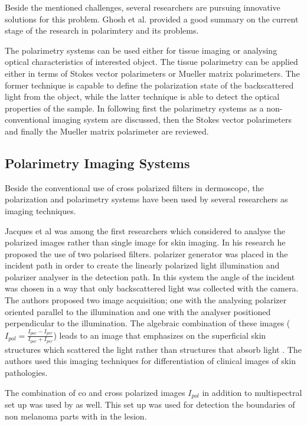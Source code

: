 \documentclass[oneside,a4,12p]{report} %
\begin{document}
	Beside the mentioned challenges, several researchers are pursuing innovative solutions for this problem. Ghosh et al. \cite{ghosh2011tissue} provided a good summary on the current stage of the research in polarimtery and its problems.
	
	The polarimetry systems can be used either for tissue imaging or analysing optical characteristics of interested object. The tissue polarimetry can be applied either in terms of Stokes vector polarimeters or Mueller matrix polarimeters. The former technique is capable to define the polarization state of the backscattered light from the object, while the latter technique is able to detect the optical properties of the sample. 
	In following first the polarimetry systems as a non-conventional imaging system are discussed, then the Stokes vector polarimeters and finally the Mueller matrix polarimeter are reviewed. 
	
	\subsection{Polarimetry Imaging Systems}
	Beside the conventional use of cross polarized filters in dermoscope, the polarization and polarimetry systems have been used by several researchers as imaging techniques.
	
	
	Jacques et al \cite{Jacques12175282} was among the first researchers which considered to analyse the polarized images rather than single image for skin imaging. In his research he proposed the use of two polarised filters. polarizer generator was placed in the incident path in order to create the linearly polarized light illumination and polarizer analyser in the detection path. In this system the angle of the incident was chosen in a way that only backscattered light was collected with the camera. The authors proposed two image acquisition; one with the analysing polarizer oriented parallel to the illumination and one with the analyser positioned perpendicular to the illumination. The algebraic combination of these images ($I_{pol} = \frac{I_{par}-I_{per}}{I_{par}+I_{per}}$) leads to an image that emphasizes on the superficial skin structures which scattered the light rather than structures that absorb light \cite{Jacques12175282}. The authors used this imaging techniques for differentiation of clinical images of skin pathologies. 
	
The combination of co and cross polarized images $I_{pol}$ in addition to multispectral set up was used by \cite{yaroslavsky2003} as well. This set up was used for detection the boundaries of non melanoma parts with in the lesion. 
\end{document}
